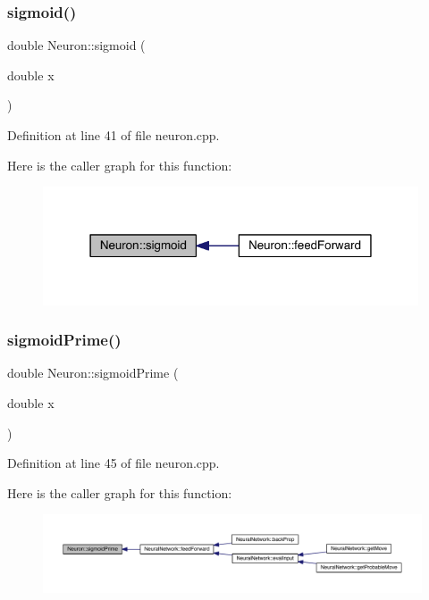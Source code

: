 \subsubsection{\texorpdfstring{sigmoid()}{sigmoid()}}
{\footnotesize\ttfamily double Neuron\+::sigmoid (\begin{DoxyParamCaption}\item[{double}]{x }\end{DoxyParamCaption})\hspace{0.3cm}{\ttfamily [static]}}



Definition at line 41 of file neuron.\+cpp.

Here is the caller graph for this function\+:\nopagebreak
\begin{figure}[H]
\begin{center}
\leavevmode
\includegraphics[width=315pt]{class_neuron_a24893b0c92f073daae4c697b35e395f5_icgraph}
\end{center}
\end{figure}
\mbox{\label{class_neuron_ad2814c90d74e4400c16a116b023447fa}} 
\subsubsection{\texorpdfstring{sigmoid\+Prime()}{sigmoidPrime()}}
{\footnotesize\ttfamily double Neuron\+::sigmoid\+Prime (\begin{DoxyParamCaption}\item[{double}]{x }\end{DoxyParamCaption})\hspace{0.3cm}{\ttfamily [static]}}



Definition at line 45 of file neuron.\+cpp.

Here is the caller graph for this function\+:\nopagebreak
\begin{figure}[H]
\begin{center}
\leavevmode
\includegraphics[width=350pt]{class_neuron_ad2814c90d74e4400c16a116b023447fa_icgraph}
\end{center}
\end{figure}
\mbox{\label{class_neuron_ab151ba9bdd3e9f2aff01e782b41f92e7}} 
